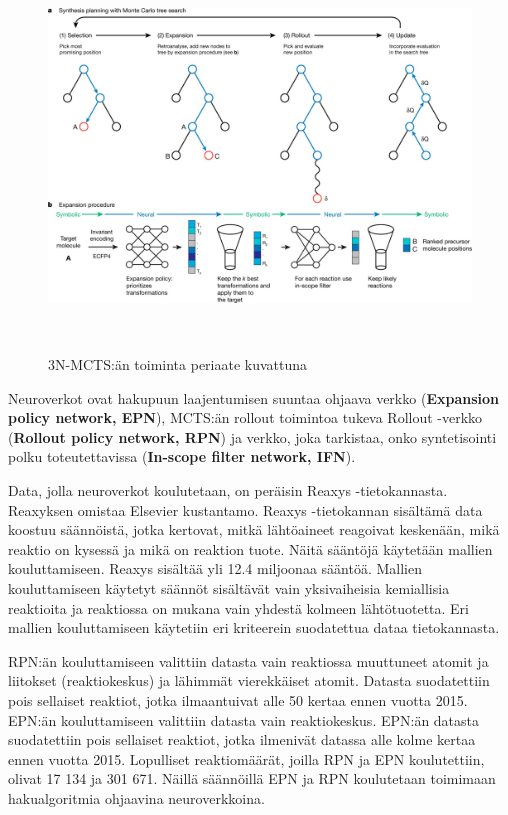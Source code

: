 \documentclass[finnish,twoside,censored,tkt,sw-line]{HYthesisML}
\begin{document}
\begin{figure}
    \centering
    \includegraphics[width=\textwidth]{3N-MCTS-fig.jpg}
    \caption{3N-MCTS:än toiminta periaate kuvattuna}
    ~\cite{SeglerMarwinHS2018Pcsw}
\end{figure}

Neuroverkot ovat hakupuun laajentumisen suuntaa ohjaava verkko (\textbf{Expansion policy network, EPN}),
MCTS:än rollout toimintoa tukeva Rollout -verkko (\textbf{Rollout policy network, RPN})
ja verkko, joka tarkistaa, onko syntetisointi polku toteutettavissa (\textbf{In-scope filter network, IFN}).

Data, jolla neuroverkot koulutetaan, on peräisin Reaxys -tietokannasta. Reaxyksen omistaa Elsevier kustantamo. Reaxys -tietokannan sisältämä data koostuu
säännöistä, jotka kertovat, mitkä lähtöaineet reagoivat keskenään, mikä reaktio on kysessä ja mikä on reaktion
tuote. Näitä sääntöjä käytetään mallien kouluttamiseen. Reaxys sisältää yli 12.4 miljoonaa sääntöä. Mallien
kouluttamiseen käytetyt säännöt sisältävät vain yksivaiheisia kemiallisia reaktioita ja reaktiossa on mukana vain
yhdestä kolmeen lähtötuotetta. Eri mallien kouluttamiseen käytetiin eri kriteerein suodatettua dataa tietokannasta.

RPN:än kouluttamiseen valittiin datasta vain reaktiossa muuttuneet atomit ja liitokset (reaktiokeskus)
ja lähimmät vierekkäiset atomit. Datasta suodatettiin pois sellaiset reaktiot, jotka ilmaantuivat
alle 50 kertaa ennen vuotta 2015. EPN:än kouluttamiseen valittiin datasta vain reaktiokeskus.
EPN:än datasta suodatettiin pois sellaiset reaktiot, jotka ilmenivät datassa alle kolme kertaa ennen vuotta
2015. Lopulliset reaktiomäärät, joilla RPN ja EPN koulutettiin, olivat 17 134 ja 301 671. Näillä säännöillä
EPN ja RPN koulutetaan toimimaan hakualgoritmia ohjaavina neuroverkkoina.
\end{document}
